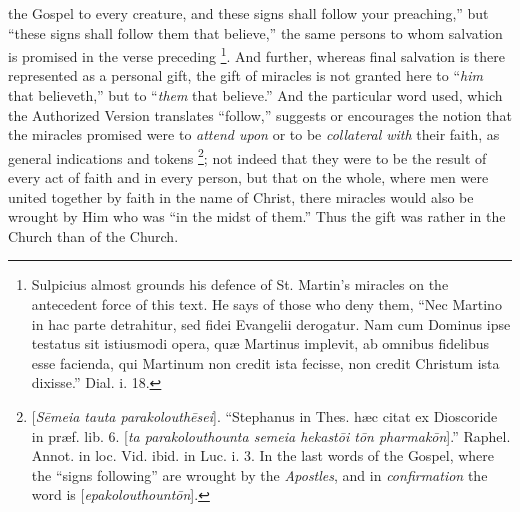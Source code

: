the Gospel to every creature, and these signs shall follow your
preaching,'' but ``these signs shall follow them that believe,'' the same
persons to whom salvation is promised in the verse preceding \footnote{Sulpicius almost grounds his defence of St. Martin's miracles on the
antecedent force of this text. He says of those who deny them, ``Nec
Martino in hac parte detrahitur, sed fidei Evangelii derogatur. Nam
cum Dominus ipse testatus sit istiusmodi opera, quæ Martinus implevit,
ab omnibus fidelibus esse facienda, qui Martinum non credit ista
fecisse, non credit Christum ista dixisse.'' Dial. i. 18.}. And further, whereas final salvation is there represented as
a personal gift, the gift of miracles is not granted here to ``\emph{him}
that believeth,'' but to ``\emph{them} that believe.'' And the particular word used, which the Authorized Version translates
``follow,'' suggests or encourages the notion that the miracles
promised were to \emph{attend upon} or to be \emph{collateral with}
their faith, as general indications and tokens \footnote{[\emph{S\={e}meia tauta parakolouth\={e}sei}]. ``Stephanus in
Thes. hæc citat ex Dioscoride in præf. lib. 6. [\emph{ta
parakolouthounta semeia hekast\={o}i t\={o}n pharmak\={o}n}].''
Raphel. Annot. in loc. Vid. ibid. in Luc. i. 3. In the last words of
the Gospel, where the ``signs following'' are wrought by the \emph{Apostles},
and in \emph{confirmation} the word is [\emph{epakolouthount\={o}n}].}; not indeed that they were to be the result of every act of
faith and in every person, but that on the whole, where men were
united together by faith in the name of Christ, there miracles would
also be wrought by Him who was ``in the midst of them.'' Thus the gift
was rather in the Church than of the Church.


